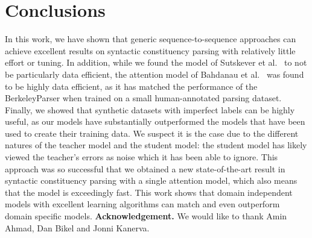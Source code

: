 \documentclass{article} \usepackage{nips15submit_e,times}
\begin{document}
\section{Conclusions}
\label{sec:concl}

In this work, we have shown that generic sequence-to-sequence
approaches can achieve excellent results on syntactic constituency
parsing with relatively little effort or tuning.  In addition, while
we found the model of Sutskever et al.~\cite{sutskever14} to not be
particularly data efficient, the attention model of Bahdanau et
al.~\cite{bahdanau2014neural} was found to be highly data efficient,
as it has matched the performance of the BerkeleyParser when trained
on a small human-annotated parsing dataset.  Finally, we showed that
synthetic datasets with imperfect labels can be highly useful, as our
models have substantially outperformed the models that have been used
to create their training data.  We suspect it is the case due to the
different natures of the teacher model and the student model: the
student model has likely viewed the teacher's errors as noise which it
has been able to ignore.  This approach was so successful that we
obtained a new state-of-the-art result in syntactic constituency
parsing with a single attention model, which also means that the model
is exceedingly fast.  This work shows that domain independent models
with excellent learning algorithms can match and even outperform
domain specific models. 
\vspace{-0mm}
{\bf Acknowledgement.} We would like to thank Amin Ahmad, Dan Bikel and Jonni Kanerva.

\vspace{-3mm}


\end{document}
